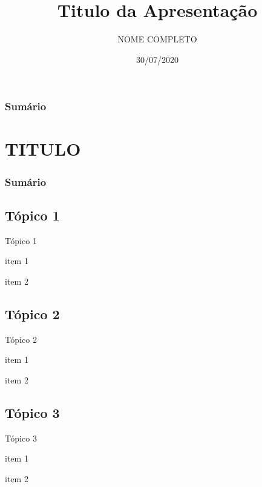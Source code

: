 \documentclass[xcolor={table}]{beamer}
\title[EVENTO]
{\textbf{Titulo da Apresentação}}
\author[NOME ABREVIADO]{NOME COMPLETO}
\date{30/07/2020}
\institute{SETOR \\ IFSP\\
\\
\url{}}
\begin{document}
\begingroup
\makeatletter
\setlength{\hoffset}{-.5\beamer@sidebarwidth}
\makeatother
\begin{frame}
    
    \titlepage
   
\end{frame}
\endgroup

\begin{frame}\frametitle{Sumário}
\tableofcontents
\end{frame}

\section{TITULO}
\begin{frame}[noframenumbering]\frametitle{Sumário}
\tableofcontents[currentsection]
\end{frame}
\subsection{Tópico 1}
\begin{frame}{Tópico 1}
    \item item 1
    \item item 2
\end{frame}
\subsection{Tópico 2}
\begin{frame}{Tópico 2}
    \item item 1
    \item item 2
\end{frame}
\subsection{Tópico 3}
\begin{frame}{Tópico 3}
    \item item 1
    \item item 2
\end{frame}

\end{document}
